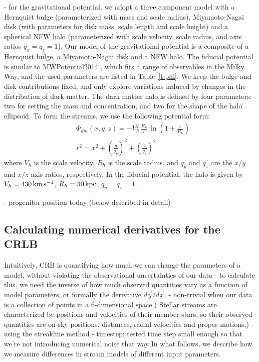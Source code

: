 \documentclass[modern]{aastex61}
\newcommand{\acronym}[1]{{\small{#1}}}
\newcommand{\CRLB}{\acronym{CRLB}}
\begin{document}
- for the gravitational potential, we adopt a three component model with a Hernquist bulge (parameterized with mass and scale radius), Miyamoto-Nagai disk (with parameters for disk mass, scale length and scale height) and a spherical NFW halo (parameterized with scale velocity, scale radius, and axis ratios $q_x=q_z=1$).
Our model of the gravitational potential is a composite of a Hernquist bulge, a Miyamoto-Nagai disk and a NFW halo.
The fiducial potential is similar to MWPotential2014 \citep{galpy}, which fits a range of observables in the Milky Way, and the used parameters are listed in Table~\ref{t:phi}.
We keep the bulge and disk contributions fixed, and only explore variations induced by changes in the distribution of dark matter.
The dark matter halo is defined by four parameters: two for setting the mass and concentration, and two for the shape of the halo ellipsoid.
To form the streams, we use the following potential form:
\begin{equation}
\begin{aligned}
& \Phi_{dm}(x, y, z) = -V_h^2\, \frac{R_h}{r}\, \ln\left(1 + \frac{r}{R_h}\right) \\
& r^2 = x^2 + \left(\frac{y}{q_y}\right)^2 + \left(\frac{z}{q_z}\right)^2
\end{aligned}
\label{eq:nfw}
\end{equation}
where $V_h$ is the scale velocity, $R_h$ is the scale radius, and $q_y$ and $q_z$ are the $x/y$ and $x/z$ axis ratios, respectively.
In the fiducial potential, the halo is given by $V_h = 430\,\rm km\,s^{-1}$, $R_h = 30\,\rm kpc$, $q_y = q_z = 1$.

- progenitor position today (below described in detail)

\subsection{Calculating numerical derivatives for the \CRLB}
\label{sec:derivatives}
Intuitively, CRB is quantifying how much we can change the parameters of a model, without violating the observational uncertainties of our data
- to calculate this, we need the inverse of how much observed quantities vary as a function of model parameters, or formally the derivative $d\vec{y}/d\vec{x}$.
- non-trivial when our data is a collection of points in a 6-dimensional space ( Stellar streams are characterized by positions and velocities of their member stars, so their observed quantities are on-sky positions, distances, radial velocities and proper motions.)
- using the streakline method \citep{bonaca}
- timestep: tested time step small enough so that we're not introducing numerical noise that way
In what follows, we describe how we measure differences in stream models of different input parameters.
\end{document}
